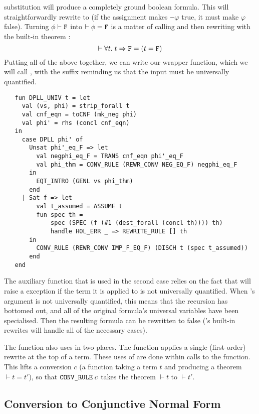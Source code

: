 substitution will produce a completely ground boolean formula.  This
will straightforwardly rewrite to  (if the assignment
makes $\neg\varphi$ true, it must make $\varphi$ false).  Turning
$\phi\vdash \holtxt{F}$ into $\vdash \phi = \holtxt{F}$ is a matter of
calling  and then rewriting with the built-in theorem
:
\[
\vdash \forall t.\;t \Rightarrow \holtxt{F} = (t = \holtxt{F})
\]
Putting all of the above together, we can write our wrapper function,
which we will call , with the  suffix
reminding us that the input must be universally quantified.
\begin{hol}
\begin{verbatim}
   fun DPLL_UNIV t = let
     val (vs, phi) = strip_forall t
     val cnf_eqn = toCNF (mk_neg phi)
     val phi' = rhs (concl cnf_eqn)
   in
     case DPLL phi' of
       Unsat phi'_eq_F => let
         val negphi_eq_F = TRANS cnf_eqn phi'_eq_F
         val phi_thm = CONV_RULE (REWR_CONV NEG_EQ_F) negphi_eq_F
       in
         EQT_INTRO (GENL vs phi_thm)
       end
     | Sat f => let
         val t_assumed = ASSUME t
         fun spec th =
             spec (SPEC (f (#1 (dest_forall (concl th)))) th)
             handle HOL_ERR _ => REWRITE_RULE [] th
       in
         CONV_RULE (REWR_CONV IMP_F_EQ_F) (DISCH t (spec t_assumed))
       end
   end
\end{verbatim}
\end{hol}

The auxiliary function  that is used in the second case
relies on the fact that  will raise a 
exception if the term it is applied to is not universally quantified.
When 's argument is not universally quantified, this means
that the recursion has bottomed out, and all of the original formula's
universal variables have been specialised.  Then the resulting formula
can be rewritten to false ('s built-in rewrites will
handle all of the necessary cases).

The  function also uses  in two places.
The  function applies a single (first-order) rewrite at
the top of a term.  These uses of  are done within
calls to the  function.  This lifts a conversion $c$ (a
function taking a term $t$ and producing a theorem $\vdash t = t'$),
so that $\ml{CONV\_RULE}\;c$ takes the theorem $\vdash t$ to $\vdash t'$.


\subsection{Conversion to Conjunctive Normal Form}
\label{sec:conv-conj-norm}

